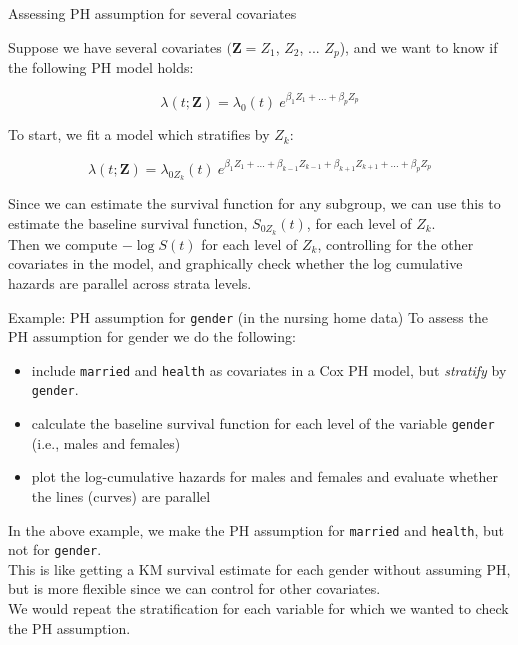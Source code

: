 \documentclass[envcountsect, 10pt, portrait, palatino]{beamer}
\begin{document}
\begin{frame}{Assessing PH assumption for several covariates}

Suppose we have several covariates $(\mathbf{Z}=  Z_1$,  $Z_2$, ... $Z_p$),
and we want to know if the following PH model holds:

\[ \lambda(t; {\mathbf{Z}})  = \lambda_0(t)~ e^{\beta_1 Z_1 + ... + \beta_p Z_p} \]

To start, we fit a model which stratifies by $Z_k$:

\[ \lambda(t; {\mathbf{Z}})  = \lambda_{0Z_k}(t) ~e^{\beta_1 Z_1 + ... +
\beta_{k-1} Z_{k-1} + \beta_{k+1} Z_{k+1} +...+ \beta_p Z_p} \]

Since we can estimate the survival function for any subgroup, we can
use this to estimate the baseline survival function,
$S_{0Z_k}(t)$, for each level of $Z_k$.
\\[2ex]
Then we compute $- \log S(t)$ for each level of $Z_k$,
controlling for the other covariates in the model, and
graphically check whether the log cumulative hazards are parallel
across strata levels.
\end{frame}
\begin{frame}{Example: PH assumption for {\tt gender} (in the nursing home data)}
To assess the PH assumption for gender we do the following:
\begin{itemize}
\item  include {\tt married} and {\tt health} as covariates in
a Cox PH model, but {\em stratify} by {\tt gender}.
\item calculate the baseline survival function for each level of
the variable {\tt gender} (i.e., males and females)
\item  plot the log-cumulative hazards for males and females and
evaluate whether the lines (curves) are parallel
\end{itemize}

In the above example, we make the PH assumption for {\tt married} and
{\tt health}, but not for {\tt gender}.
\\[2ex]
This is like getting a KM survival estimate for each gender without
assuming PH, but is more flexible since we can control for other covariates.
\\[2ex]
We would repeat the stratification for each variable for which we
wanted to check the PH assumption.
\end{frame}
\end{document}
